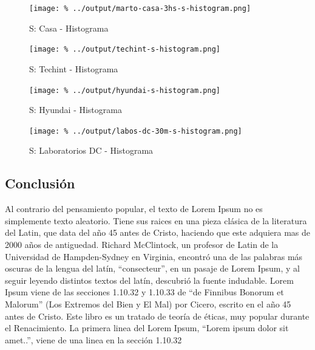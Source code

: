 \documentclass[final,narroweqnarray,inline]{ieee}
\begin{document}
    \begin{figure}[h]\begin{center}
      \texttt{[image: \%
      ../output/marto-casa-3hs-s-histogram.png]}
      \caption{S: Casa - Histograma}
      \label{marto-casa-3hs-s-histogram}
    \end{center}\end{figure}
    \begin{figure}[h]\begin{center}
      \texttt{[image: \%
      ../output/techint-s-histogram.png]}
      \caption{S: Techint - Histograma}
      \label{techint-s-histogram}
    \end{center}\end{figure}
    \begin{figure}[h]\begin{center}
      \texttt{[image: \%
      ../output/hyundai-s-histogram.png]}
      \caption{S: Hyundai - Histograma}
      \label{hyundai-s-histogram}
    \end{center}\end{figure}
    \begin{figure}[h]\begin{center}
      \texttt{[image: \%
      ../output/labos-dc-30m-s-histogram.png]}
      \caption{S: Laboratorios DC - Histograma}
      \label{labos-dc-30m-s-histogram}
    \end{center}\end{figure}


  \subsection{Conclusión}

Al contrario del pensamiento popular, el texto de Lorem Ipsum no es simplemente texto aleatorio. Tiene sus raices en una pieza clásica de la literatura del Latin, que data del año 45 antes de Cristo, haciendo que este adquiera mas de 2000 años de antiguedad. Richard McClintock, un profesor de Latin de la Universidad de Hampden-Sydney en Virginia, encontró una de las palabras más oscuras de la lengua del latín, ``consecteur'', en un pasaje de Lorem Ipsum, y al seguir leyendo distintos textos del latín, descubrió la fuente indudable. Lorem Ipsum viene de las secciones 1.10.32 y 1.10.33 de ``de Finnibus Bonorum et Malorum'' (Los Extremos del Bien y El Mal) por Cicero, escrito en el año 45 antes de Cristo. Este libro es un tratado de teoría de éticas, muy popular durante el Renacimiento. La primera linea del Lorem Ipsum, ``Lorem ipsum dolor sit amet..'', viene de una linea en la sección 1.10.32
\end{document}

